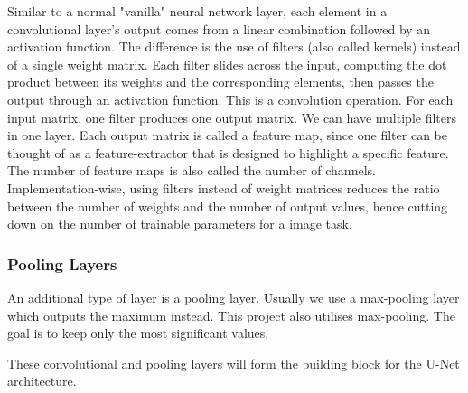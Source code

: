 \documentclass[12pt]{article}
\begin{document}
Similar to a normal "vanilla" neural network layer, each element in a convolutional layer's output comes from a linear combination 
followed by an activation function.
The difference is the use of filters (also called kernels) instead of a single weight matrix.
Each filter slides across the input, computing the dot product between its weights and the corresponding elements, then passes the output through an activation function.
This is a convolution operation.
For each input matrix, one filter produces one output matrix.
We can have multiple filters in one layer.
Each output matrix is called a feature map, since one filter can be thought of as a feature-extractor that is designed to highlight a specific feature. The number of feature maps is also called the number of channels.
Implementation-wise, using filters instead of weight matrices reduces the ratio between the number of weights and the number of output values, hence cutting down on the number of trainable parameters for 
a image task.



\subsubsection*{Pooling Layers}




An additional type of layer is a pooling layer. Usually we use a max-pooling layer which outputs the maximum instead. This project also utilises max-pooling. The goal is to keep only the most significant values.

These convolutional and pooling layers will form the building block for the U-Net architecture.
\end{document}
